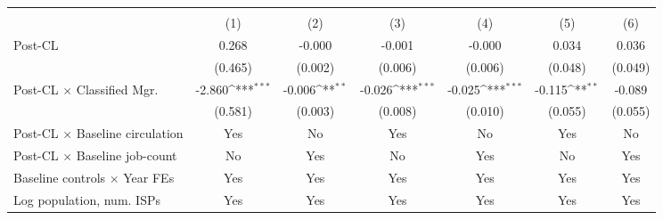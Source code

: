 {
\def\sym#1{\ifmmode^{#1}\else\(^{#1}\)\fi}
\begin{tabular}{l*{6}{c}}
\toprule
                    &&&&\\\cmidrule(lr){2-2}\cmidrule(lr){3-3}\cmidrule(lr){4-5}\cmidrule(lr){6-7}
                    &         &         &         &         &         &         \\
\midrule
Post-CL             &       0.268         &      -0.000         &      -0.001         &      -0.000         &       0.034         &       0.036         \\
                    &     (0.465)         &     (0.002)         &     (0.006)         &     (0.006)         &     (0.048)         &     (0.049)         \\
\addlinespace
Post-CL $\times$ Classified Mgr.&      -2.860\sym{***}&      -0.006\sym{**} &      -0.026\sym{***}&      -0.025\sym{***}&      -0.115\sym{**} &      -0.089         \\
                    &     (0.581)         &     (0.003)         &     (0.008)         &     (0.010)         &     (0.055)         &     (0.055)         \\
\addlinespace
Post-CL $\times$ Baseline circulation &         Yes         &          No         &         Yes         &          No         &         Yes         &          No         \\
\addlinespace
Post-CL $\times$ Baseline job-count &          No         &         Yes         &          No         &         Yes         &          No         &         Yes         \\
\addlinespace
Baseline controls $\times$ Year FEs &         Yes         &         Yes         &         Yes         &         Yes         &         Yes         &         Yes         \\
\addlinespace
Log population, num. ISPs &         Yes         &         Yes         &         Yes         &         Yes         &         Yes         &         Yes         \\

\end{tabular}}
